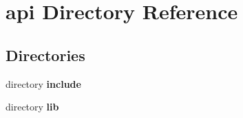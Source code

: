 \section{api Directory Reference}
\label{dir_0188a3e6da905bc60aceb35bf790b8c9}
\subsection*{Directories}
\begin{DoxyCompactItemize}
\item 
directory {\bf include}
\item 
directory {\bf lib}
\end{DoxyCompactItemize}
